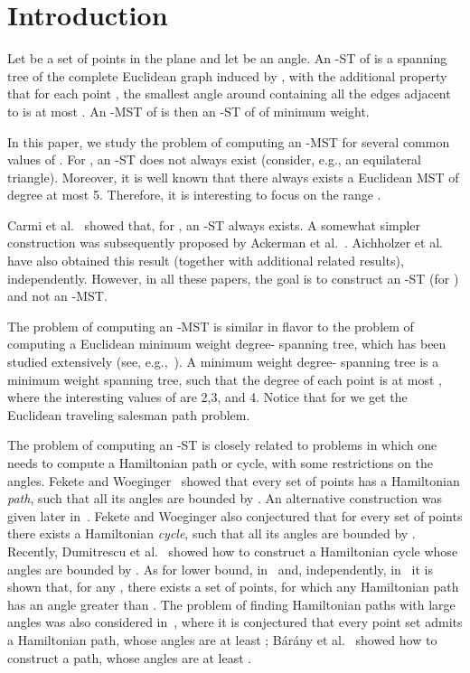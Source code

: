 \documentclass[11pt]{article}
\begin{document}
\section {Introduction}

Let  be a set of points in the plane and let  be an angle. An -ST of  is a spanning tree of the complete Euclidean graph induced by , with the additional property that for each point , the smallest angle around  containing all the edges adjacent to  is at most . An -MST of  is then an -ST of  of minimum weight.
 
In this paper, we study the problem of computing an -MST for several common values of . For , an -ST does not always exist (consider, e.g., an equilateral triangle). Moreover, it is well known that there always exists a Euclidean MST of degree at most 5.
Therefore, it is interesting to focus on the range .

Carmi et al.~\cite{CKLR11} showed that, for , an -ST always exists. A somewhat simpler construction was subsequently proposed by Ackerman et al.~\cite{AGP13}. Aichholzer et al.~\cite{AHHHPSSV13} have also obtained this result (together with additional related results),   independently. However, in all these papers, the goal is to construct an -ST (for ) and not an -MST. 

The problem of computing an -MST is similar in flavor to the problem of computing a Euclidean minimum weight degree- spanning tree, which has been studied extensively (see, e.g.,~\cite{A98, C04, JR09, KRY96, M99}). A minimum weight degree- spanning tree is a minimum weight spanning tree, such that the degree of each point is at most , where the interesting values of  are 2,3, and 4. Notice that for  we get the Euclidean traveling salesman path problem. 

The problem of computing an -ST is closely related to problems in which one needs to compute a Hamiltonian path or cycle, with some restrictions on the angles. Fekete and Woeginger~\cite{FW97} showed that every set of points has a Hamiltonian {\em path}, such that all its angles are bounded by . An alternative construction was given later in~\cite{CKLR11}. Fekete and Woeginger also conjectured that for every set of  points there exists a Hamiltonian {\em cycle}, such that all its angles are bounded by . Recently, Dumitrescu et al.~\cite{DPT12} showed how to construct a Hamiltonian cycle whose angles are bounded by .
As for lower bound, in~\cite{CKLR11} and, independently, in~\cite{DPT12} it is shown that, for any , there exists a set of points, for which any Hamiltonian path has an angle greater than .
The problem of finding Hamiltonian paths with large angles was also considered in~\cite{FW97}, where it is conjectured that every point set admits a Hamiltonian path, whose angles are at least ; B{\'a}r{\'a}ny et al.~\cite{BPV09} showed how to construct a path, whose angles are at least . 
\end{document}
